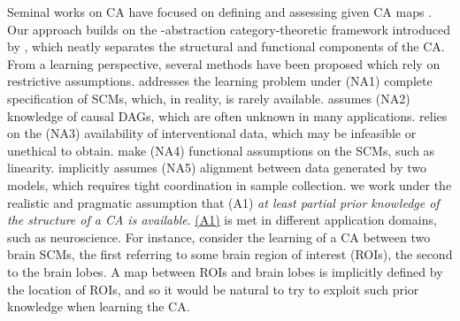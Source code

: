 Seminal works on CA have focused on defining and assessing given CA maps \cite{rubenstein2017causal,beckers2019abstracting}. 
Our approach builds on the \abst-abstraction category-theoretic framework introduced by \cite{rischel2020category}, which neatly 
separates the structural and functional components of the CA. From a learning perspective, several methods have been proposed which rely on restrictive assumptions.
\cite{zennaro2023jointly} addresses the learning problem under \hypertarget{NA1}{(NA1)} complete specification of SCMs, which, in reality, is rarely available. 
\cite{felekis2024causal} assumes \hypertarget{(NA2)}{(NA2)} knowledge of causal DAGs, which are often unknown in many applications.
\cite{dyer2024a} relies on the \hypertarget{NA3}{(NA3)} availability of interventional data, which may be infeasible or unethical to obtain.
\cite{kekic2023targeted,massidda2024learningcausalabstractionslinear} make 
\hypertarget{(NA4)}{(NA4)} functional assumptions on the SCMs, such as linearity. \cite{massidda2024learningcausalabstractionslinear} implicitly assumes \hypertarget{(NA5)}{(NA5)} alignment between data generated by two models, which requires tight coordination in sample collection.  we work under the realistic and pragmatic assumption that \hypertarget{(A1)}{(A1)} \emph{at least partial prior knowledge of the structure of a CA is available}.
\hyperlink{(A1)}{(A1)} is met in different application domains, such as neuroscience.
For instance, consider the learning of a CA between two brain SCMs, the first referring to some brain region of interest (ROIs), the second to the brain lobes.
A map between ROIs and brain lobes is implicitly defined by the location of ROIs, and so it would be natural to try to exploit such prior knowledge when learning the CA.

